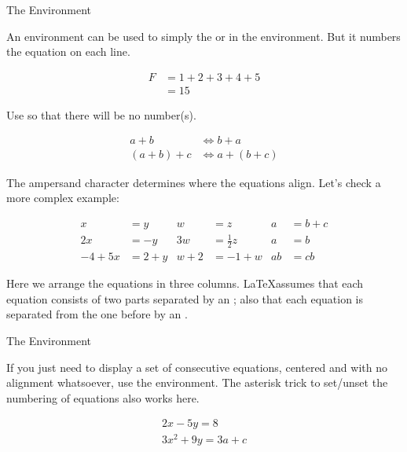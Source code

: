 \begin{frame}[fragile]{The  Environment}

An  environment can be used to simply the  or  in the   environment. But it numbers the equation on each line.

\begin{latexexamplesplit}
\begin{align}
  F &= 1+2+3+4+5 \\
    &= 15
\end{align}
\end{latexexamplesplit}

Use  so that there will be no number(s).

\begin{latexexamplesplit}[0.6]
\begin{align*}
  a+b & \Leftrightarrow b+a \\
  (a+b)+c & \Leftrightarrow a+(b+c)
\end{align*}
\end{latexexamplesplit}

\end{frame}

\begin{frame}[fragile]

The ampersand character \LC{&} determines where the equations align. Let's check a more complex example:

\begin{latexexample}
\begin{align*}
  x&=y           &  w &=z              &  a&=b+c \\
  2x&=-y         &  3w&=\frac{1}{2}z   &  a&=b \\
  -4 + 5x&=2+y   &  w+2&=-1+w          &  ab&=cb
\end{align*}
\end{latexexample}

Here we arrange the equations in three columns. \LaTeX assumes that each equation consists of two parts separated by an \LC{&}; also that each equation is separated from the one before by an \LC{&}.

\end{frame}


\begin{frame}[fragile]{The  Environment}

If you just need to display a set of consecutive equations, centered and with no alignment whatsoever, use the  environment. The asterisk trick to set/unset the numbering of equations also works here.

\begin{latexexamplesplit}
\begin{gather} 
  2x - 5y =  8 \\ 
  3x^2 + 9y =  3a + c
\end{gather}
\end{latexexamplesplit}

\end{frame}

